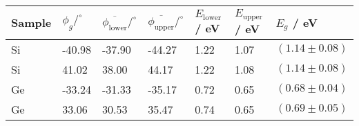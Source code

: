 	\begin{tabular}{|p{1.5cm}|p{1.5cm}|p{1.5cm}|p{1.5cm}|p{2cm}|p{2cm}|p{2.7cm}|}
		\hline
		\rowcolor{tabcolor}
		Sample & $\phi_g / ^\circ$ & 
 			$\overline{\phi_\mathrm{lower}}/ ^\circ$  & $\overline{\phi_\mathrm{upper}}/ ^\circ$  &
 			$E_\mathrm{lower}$/ eV & $E_\mathrm{upper}$/ eV  &  $E_g$ / eV \\ \hline
		Si & -40.98 & -37.90 & -44.27  & 1.22 & 1.07 & $(1.14 \pm 0.08)$\\ 
		Si & 41.02 & 38.00 & 44.17  & 1.22 & 1.08 & $(1.14 \pm 0.08)$\\ 
		Ge & -33.24 & -31.33 & -35.17  & 0.72 & 0.65 & $(0.68 \pm 0.04)$\\ 
		Ge & 33.06 & 30.53 & 35.47  & 0.74 & 0.65 & $(0.69 \pm 0.05)$\\ 
		\hline
	\end{tabular}
